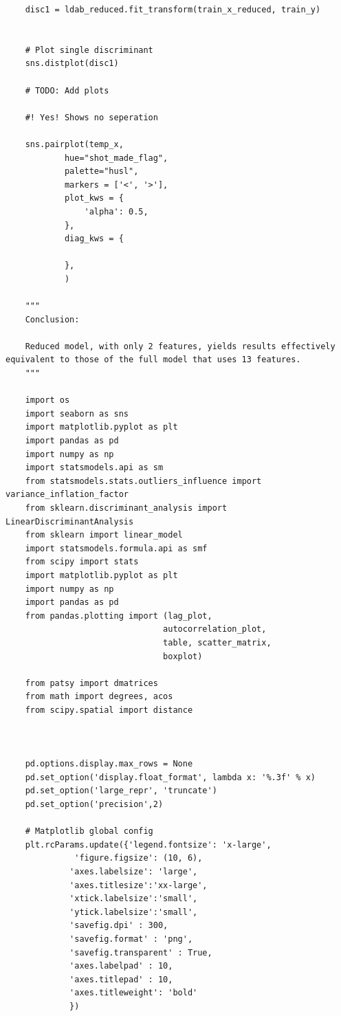\begin{verbatim}
    disc1 = ldab_reduced.fit_transform(train_x_reduced, train_y)


    # Plot single discriminant
    sns.distplot(disc1)

    # TODO: Add plots

    #! Yes! Shows no seperation

    sns.pairplot(temp_x,
            hue="shot_made_flag",
            palette="husl",
            markers = ['<', '>'],
            plot_kws = {
                'alpha': 0.5,
            },
            diag_kws = {

            },
            )

    """
    Conclusion:

    Reduced model, with only 2 features, yields results effectively equivalent to those of the full model that uses 13 features.
    """

    import os
    import seaborn as sns
    import matplotlib.pyplot as plt
    import pandas as pd
    import numpy as np
    import statsmodels.api as sm
    from statsmodels.stats.outliers_influence import variance_inflation_factor
    from sklearn.discriminant_analysis import LinearDiscriminantAnalysis
    from sklearn import linear_model
    import statsmodels.formula.api as smf
    from scipy import stats
    import matplotlib.pyplot as plt
    import numpy as np
    import pandas as pd
    from pandas.plotting import (lag_plot,
                                autocorrelation_plot,
                                table, scatter_matrix,
                                boxplot)

    from patsy import dmatrices
    from math import degrees, acos
    from scipy.spatial import distance



    pd.options.display.max_rows = None
    pd.set_option('display.float_format', lambda x: '%.3f' % x)
    pd.set_option('large_repr', 'truncate')
    pd.set_option('precision',2)

    # Matplotlib global config
    plt.rcParams.update({'legend.fontsize': 'x-large',
              'figure.figsize': (10, 6),
             'axes.labelsize': 'large',
             'axes.titlesize':'xx-large',
             'xtick.labelsize':'small',
             'ytick.labelsize':'small',
             'savefig.dpi' : 300,
             'savefig.format' : 'png',
             'savefig.transparent' : True,
             'axes.labelpad' : 10,
             'axes.titlepad' : 10,
             'axes.titleweight': 'bold'
             })


\end{verbatim}
